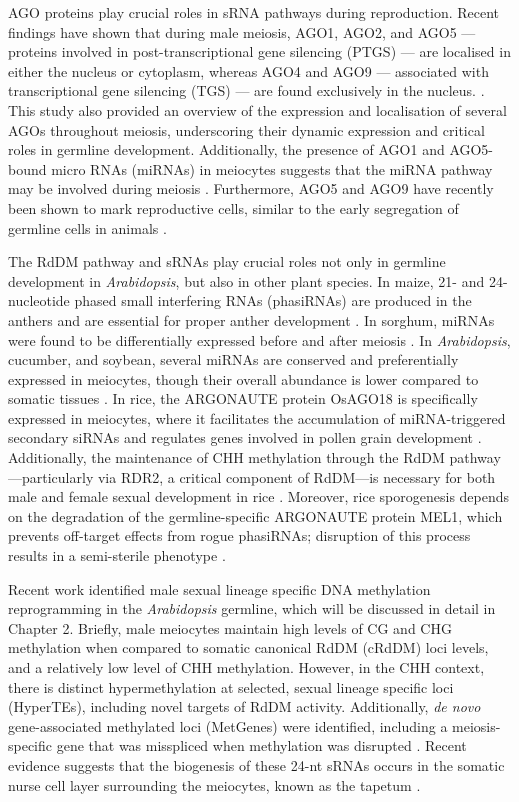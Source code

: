 AGO proteins play crucial roles in sRNA pathways during reproduction. Recent findings have shown that during male meiosis, AGO1, AGO2, and AGO5 — proteins involved in post-transcriptional gene silencing (PTGS) — are localised in either the nucleus or cytoplasm, whereas AGO4 and AGO9 — associated with transcriptional gene silencing (TGS) — are found exclusively in the nucleus. \citep{RN149}. This study also provided an overview of the expression and localisation of several AGOs throughout meiosis, underscoring their dynamic expression and critical roles in germline development. Additionally, the presence of AGO1 and AGO5-bound micro RNAs (miRNAs) in meiocytes suggests that the miRNA pathway may be involved during meiosis \citep{RN149}. Furthermore, AGO5 and AGO9 have recently been shown to mark reproductive cells, similar to the early segregation of germline cells in animals \citep{RN291}. 

The RdDM pathway and sRNAs play crucial roles not only in germline development in \textit{Arabidopsis}, but also in other plant species. In maize, 21- and 24-nucleotide phased small interfering RNAs (phasiRNAs) are produced in the anthers and are essential for proper anther development \citep{RN292,RN293}. In sorghum, miRNAs were found to be differentially expressed before and after meiosis \citep{RN150}. In \textit{Arabidopsis}, cucumber, and soybean, several miRNAs are conserved and preferentially expressed in meiocytes, though their overall abundance is lower compared to somatic tissues \citep{RN151}. In rice, the ARGONAUTE protein OsAGO18 is specifically expressed in meiocytes, where it facilitates the accumulation of miRNA-triggered secondary siRNAs and regulates genes involved in pollen grain development \citep{RN153}. Additionally, the maintenance of CHH methylation through the RdDM pathway—particularly via RDR2, a critical component of RdDM—is necessary for both male and female sexual development in rice \citep{RN154}. Moreover, rice sporogenesis depends on the degradation of the germline-specific ARGONAUTE protein MEL1, which prevents off-target effects from rogue phasiRNAs; disruption of this process results in a semi-sterile phenotype \citep{RN155}.

Recent work identified male sexual lineage specific DNA methylation reprogramming in the \textit{Arabidopsis} germline, which will be discussed in detail in Chapter 2. Briefly, male meiocytes maintain high levels of CG and CHG methylation when compared to somatic canonical RdDM (cRdDM) loci levels, and a relatively low level of CHH methylation. However, in the CHH context, there is distinct hypermethylation at selected, sexual lineage specific loci (HyperTEs), including novel targets of RdDM activity. Additionally, \textit{de novo} gene-associated methylated loci (MetGenes) were identified, including a meiosis-specific gene that was misspliced when methylation was disrupted \citep{RN199}. Recent evidence suggests that the biogenesis of these 24-nt sRNAs occurs in the somatic nurse cell layer surrounding the meiocytes, known as the tapetum \citep{RN187}. 

